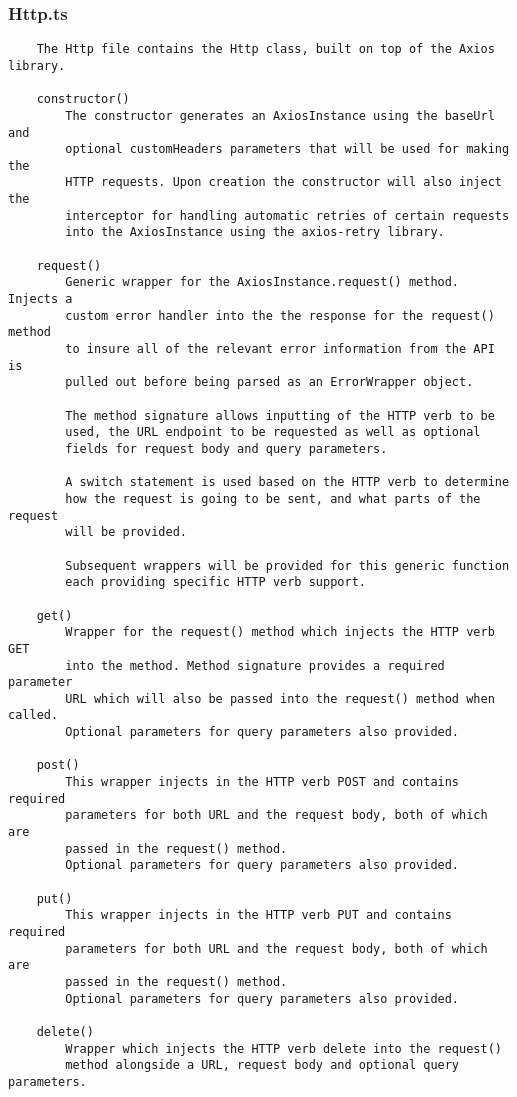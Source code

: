 \subsubsection{Http.ts}
\begin{verbatim}
    The Http file contains the Http class, built on top of the Axios library. 
    
    constructor()
        The constructor generates an AxiosInstance using the baseUrl and 
        optional customHeaders parameters that will be used for making the 
        HTTP requests. Upon creation the constructor will also inject the 
        interceptor for handling automatic retries of certain requests 
        into the AxiosInstance using the axios-retry library.
        
    request()
        Generic wrapper for the AxiosInstance.request() method. Injects a 
        custom error handler into the the response for the request() method 
        to insure all of the relevant error information from the API is 
        pulled out before being parsed as an ErrorWrapper object.
        
        The method signature allows inputting of the HTTP verb to be
        used, the URL endpoint to be requested as well as optional 
        fields for request body and query parameters.
        
        A switch statement is used based on the HTTP verb to determine
        how the request is going to be sent, and what parts of the request
        will be provided.
        
        Subsequent wrappers will be provided for this generic function
        each providing specific HTTP verb support.
        
    get()
        Wrapper for the request() method which injects the HTTP verb GET 
        into the method. Method signature provides a required parameter
        URL which will also be passed into the request() method when called.
        Optional parameters for query parameters also provided.
    
    post()
        This wrapper injects in the HTTP verb POST and contains required
        parameters for both URL and the request body, both of which are
        passed in the request() method.
        Optional parameters for query parameters also provided.
    
    put()
        This wrapper injects in the HTTP verb PUT and contains required
        parameters for both URL and the request body, both of which are
        passed in the request() method.
        Optional parameters for query parameters also provided.
    
    delete()
        Wrapper which injects the HTTP verb delete into the request()
        method alongside a URL, request body and optional query parameters.
        
\end{verbatim}
